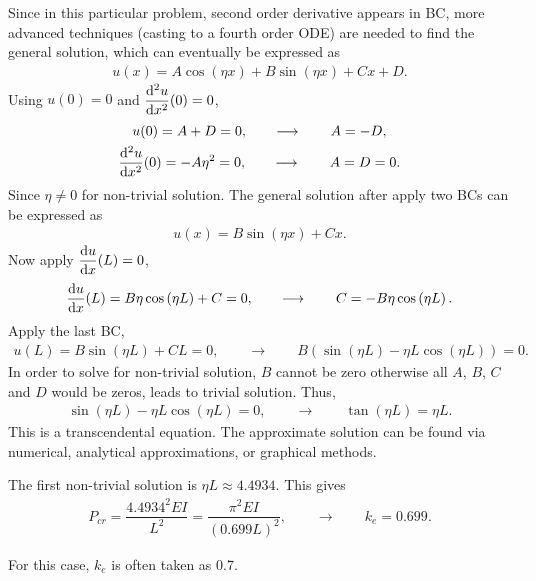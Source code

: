 \begin{solution}
Since in this particular problem, second order derivative appears in BC, more advanced techniques (casting to a fourth order ODE) are needed to find the general solution, which can eventually be expressed as
\begin{gather*}
u(x)=A\cos\left(\eta{}x\right)+B\sin\left(\eta{}x\right)+Cx+D.
\end{gather*}
Using $u(0)=0$ and $\dfrac{\mathrm{d}^2u}{\mathrm{d}x^2}(0)=0$,
\begin{gather*}
u(0)=A+D=0,\qquad\longrightarrow\qquad{}A=-D,\\
\dfrac{\mathrm{d}^2u}{\mathrm{d}x^2}(0)=-A\eta^2=0,\qquad\longrightarrow\qquad{}A=D=0.
\end{gather*}
Since $\eta\neq0$ for non-trivial solution. The general solution after apply two BCs can be expressed as
\begin{gather*}
u(x)=B\sin\left(\eta{}x\right)+Cx.
\end{gather*}
Now apply $\dfrac{\mathrm{d}u}{\mathrm{d}x}(L)=0$,
\begin{gather*}
\dfrac{\mathrm{d}u}{\mathrm{d}x}(L)=B\eta\cos\left(\eta{}L\right)+C=0,\qquad\longrightarrow\qquad{}C=-B\eta\cos\left(\eta{}L\right).
\end{gather*}
Apply the last BC,
\begin{gather*}
u(L)=B\sin\left(\eta{}L\right)+CL=0,\qquad\longrightarrow\qquad{}B\left(\sin\left(\eta{}L\right)-\eta{}L\cos\left(\eta{}L\right)\right)=0.
\end{gather*}
In order to solve for non-trivial solution, $B$ cannot be zero otherwise all $A$, $B$, $C$ and $D$ would be zeros, leads to trivial solution. Thus,
\begin{gather*}
\sin\left(\eta{}L\right)-\eta{}L\cos\left(\eta{}L\right)=0,\qquad\longrightarrow\qquad{}
\tan\left(\eta{}L\right)=\eta{}L.
\end{gather*}
This is a transcendental equation. The approximate solution can be found via numerical, analytical approximations, or graphical methods.
\begin{figure}[H]
\centering
\end{figure}
The first non-trivial solution is $\eta{}L\approx4.4934$. This gives
\begin{gather*}
P_{cr}=\dfrac{4.4934^2EI}{L^2}=\dfrac{\pi^2EI}{\left(0.699L\right)^2},\qquad\longrightarrow\qquad{}k_e=0.699.
\end{gather*}

For this case, $k_e$ is often taken as \num{0.7}.
\end{solution}

